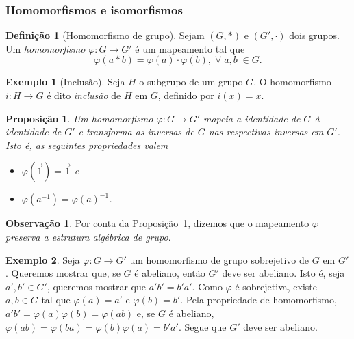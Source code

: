 \documentclass[a4paper,12pt]{report}
\theoremstyle{plain}
\newtheorem{proposicao}{Proposição}[section]
\theoremstyle{definition}
\newtheorem{definicao}{Definição}[section]
\newtheorem{observacao}{Observação}[section]
\newtheorem{exemplo}{Exemplo}[section]
\begin{document}
\subsubsection{Homomorfismos e isomorfismos}

\begin{definicao}[Homomorfismo de grupo]
	Sejam \((G,*)\) e \((G',\cdot)\) dois grupos. Um \emph{homomorfismo} \(\varphi: G\longrightarrow G'\) é um mapeamento tal que
	\begin{equation}\tag{propriedade de homomorfismo}
		\varphi(a*b) = \varphi(a)\cdot\varphi(b), \; \forall \; a,b\; \in G.
	\end{equation}
\end{definicao}

\begin{exemplo}[Inclusão]
	Seja \(H\) o subgrupo de um grupo \(G\). O homomorfismo \(i: H \longrightarrow G\) é dito \emph{inclusão} de \(H\) em \(G\), definido por \(i(x) = x\).
\end{exemplo}

\begin{proposicao}\label{prop:homo}
	 Um homomorfismo \(\varphi: G\longrightarrow G'\) mapeia a identidade de $G$ à identidade de $G'$ e transforma as inversas de $G$ nas respectivas inversas em $G'$. Isto é, as seguintes propriedades valem
	 \begin{itemize}
	 	\item \(\varphi(\vec{1}) = \vec{1}\) e 
	 	\item \(\varphi(a^{-1}) = \varphi(a)^{-1}\).	
 	 \end{itemize}
	  
\end{proposicao}

\begin{observacao}
	Por conta da Proposição~\ref{prop:homo}, dizemos que o mapeamento $\varphi$ \emph{preserva a estrutura algébrica de grupo}.
\end{observacao}

\begin{exemplo}
	Seja $\varphi: G \longrightarrow G'$ um homomorfismo de grupo sobrejetivo de $G$ em $G'$. Queremos mostrar que, se $G$ é abeliano, então $G'$ deve ser abeliano. Isto é, seja $a',b'\in G'$, queremos mostrar que $a'b' = b'a'$. Como $\varphi$ é sobrejetiva, existe $a,b\in G$ tal que $\varphi(a) = a'$ e $\varphi(b) = b'$. Pela propriedade de homomorfismo, $a'b' = \varphi(a)\varphi(b) = \varphi(ab)$ e, se $G$ é abeliano, $\varphi(ab) = \varphi(ba) = \varphi(b)\varphi(a) = b'a'$. Segue que $G'$ deve ser abeliano.
\end{exemplo}
\end{document}
